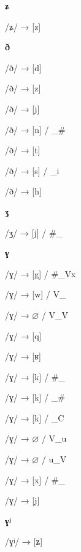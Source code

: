 \begin{center}\textbf{ʑ}\end{center}
\begin{multicols}{4}
\noindent /ʑ/ → [z]

\end{multicols}

\begin{center}\textbf{ð}\end{center}
\begin{multicols}{4}
\noindent /ð/ → [d]

\noindent /ð/ → [z]

\noindent /ð/ → [j]

\noindent /ð/ → [n] / \_\#

\noindent /ð/ → [t]

\noindent /ð/ → [s] / \_i

\noindent /ð/ → [h]

\end{multicols}

\begin{center}\textbf{ʒ}\end{center}
\begin{multicols}{4}
\noindent /ʒ/ → [j] / \#\_

\end{multicols}

\begin{center}\textbf{ɣ}\end{center}
\begin{multicols}{4}
\noindent /ɣ/ → [g] / \#\_Vx

\noindent /ɣ/ → [w] / V\_

\noindent /ɣ/ → $\varnothing$ / V\_V

\noindent /ɣ/ → [q]

\noindent /ɣ/ → [ʁ]

\noindent /ɣ/ → [k] / \#\_

\noindent /ɣ/ → [k] / \_\#

\noindent /ɣ/ → [k] / \_C

\noindent /ɣ/ → $\varnothing$ / V\_u

\noindent /ɣ/ → $\varnothing$ / u\_V

\noindent /ɣ/ → [x] / \#\_

\noindent /ɣ/ → [j]

\end{multicols}

\begin{center}\textbf{ɣʲ}\end{center}
\begin{multicols}{4}
\noindent /ɣʲ/ → [ʑ]

\end{multicols}

